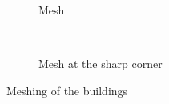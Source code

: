 \begin{figure}
    \begin{subfigure}[b]{1\linewidth}
        \centering
        \caption{Mesh}
    \end{subfigure}\\
    \begin{subfigure}[b]{1\linewidth}
        \centering
        \caption{Mesh at the sharp corner}
    \end{subfigure}
    \caption{Meshing of the buildings}
    \label{qdt_fig:ex_building_mesh}
\end{figure}

